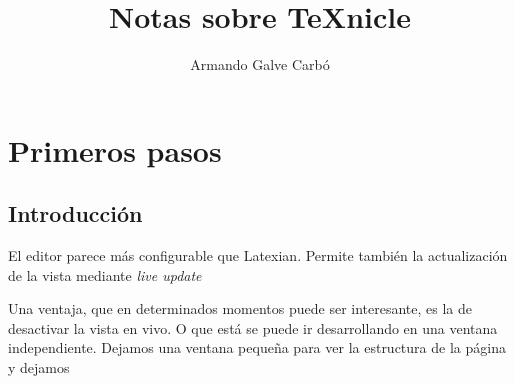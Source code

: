 \documentclass[11pt]{article}
\title{Notas sobre TeXnicle}
\author{Armando Galve Carbó}
\date{}
\begin{document}
\maketitle
\section{Primeros pasos}
\subsection{Introducción} El editor parece más configurable que Latexian. 
Permite también la actualización de la vista mediante \textit{live update}

Una ventaja, que en determinados momentos puede ser interesante, es la de 
desactivar la vista en vivo. O que está se puede ir desarrollando en una ventana 
independiente. Dejamos una ventana pequeña para ver la estructura de la página y 
dejamos 
\end{document}
